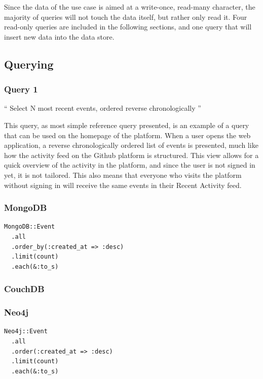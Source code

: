 Since the data of the use case is aimed at a write-once, read-many character, the majority of queries will not touch the data itself, but rather only read it.
Four read-only queries are included in the following sections, and one query that will insert new data into the data store.

\subsection{Querying}
\label{subsec:querying}

\subsubsection{Query 1}
\label{subsubsec:query-1}

``
Select N most recent events, ordered reverse chronologically
''

This query, as most simple reference query presented, is an example of a query that can be used on the homepage of the platform.
When a user opens the web application, a reverse chronologically ordered list of events is presented, much like how the activity feed on the Github platform is structured.
This view allows for a quick overview of the activity in the platform, and since the user is not signed in yet, it is not tailored.
This also means that everyone who visits the platform without signing in will receive the same events in their Recent Activity feed.

\subsubsection*{MongoDB}

\begin{verbatim}
MongoDB::Event
  .all
  .order_by(:created_at => :desc)
  .limit(count)
  .each(&:to_s)
\end{verbatim}

\subsubsection*{CouchDB}


\subsubsection*{Neo4j}

\begin{verbatim}
Neo4j::Event
  .all
  .order(:created_at => :desc)
  .limit(count)
  .each(&:to_s)
\end{verbatim}

